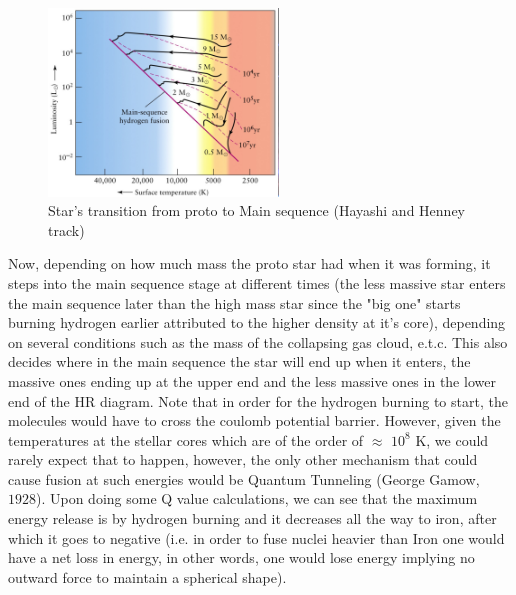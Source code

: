 \documentclass[a4paper,twoside]{report}
\numberwithin{equation}{section}
\begin{document}
\paragraph{}
\begin{figure}
\includegraphics[width=1.0\linewidth, height=5cm]{HR_Diagram.jpg}
\caption{Star's transition from proto to Main sequence (Hayashi and Henney track)}
\label{Hayashi and henney track}
\end{figure} 
Now, depending on how much mass the proto star had when it was forming, it steps into the main sequence stage at different times (the less massive star enters the main sequence later than the high mass star since the "big one" starts burning hydrogen earlier attributed to the higher density at it's core), depending on several conditions such as the mass of the collapsing gas cloud, e.t.c. This also decides where in the main sequence the star will end up when it enters, the massive ones ending up at the upper end and the less massive ones in the lower end of the HR diagram. Note that in order for the hydrogen burning to start, the molecules would have to cross the coulomb potential barrier. However, given the temperatures at the stellar cores which are of the order of $\approx$ $10^8$ K, we could rarely expect that to happen, however, the only other mechanism that could cause fusion at such energies would be Quantum Tunneling (George Gamow, $1928$). Upon doing some Q value calculations, we can see that the maximum energy release is by hydrogen burning and it decreases all the way to iron, after which it goes to negative (i.e. in order to fuse nuclei heavier than Iron one would have a net loss in energy, in other words, one would lose energy implying no outward force to maintain a spherical shape).
\end{document}
